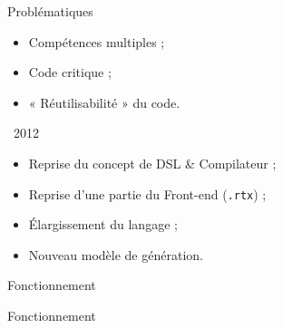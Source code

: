 \documentclass[xcolor={usenames,svgnames}]{beamer}
\begin{document}
\begin{frame}{Problématiques}
\Large{
\begin{itemize}
\item Compétences multiples ;
\item Code critique ; %
\item « Réutilisabilité » du code. %
\end{itemize}
}
\end{frame}

\begin{frame}{\rtx\ 2012}
\Large{
\begin{itemize}
\item Reprise du concept de DSL \& Compilateur ;
\item Reprise d'une partie du Front-end (\texttt{.rtx}) ;
\item Élargissement du langage ;
\item Nouveau modèle de génération.
\end{itemize}
}
\end{frame}

\begin{frame}[fragile]{Fonctionnement}
\end{frame}

\begin{frame}[fragile]{Fonctionnement}
\end{frame}
\end{document}
